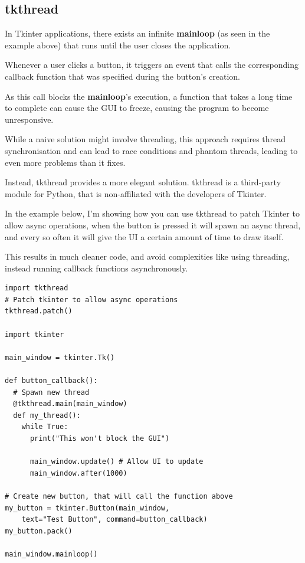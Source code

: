 \subsection{tkthread}
In Tkinter applications, there exists an infinite \textbf{mainloop}
(as seen in the example above)
that runs until the user closes the application.

Whenever a user clicks a button,
it triggers an event that calls the corresponding callback function
that was specified during the button's creation.

As this call blocks the \textbf{mainloop}'s execution,
a function that takes a long time to complete can cause the GUI to freeze,
causing the program to become unresponsive.

While a naive solution might involve threading,
this approach requires thread synchronisation and can lead to race conditions
and phantom threads, leading to even more problems than it fixes.

Instead, tkthread \cite{tkthread} provides a more elegant solution.
tkthread is a third-party module for Python,
that is non-affiliated with the developers of Tkinter.

In the example below, I'm showing how you can use tkthread to patch
Tkinter to allow async operations,
when the button is pressed it will spawn an async thread,
and every so often it will give the
UI a certain amount of time to draw itself.

This results in much cleaner code,
and avoid complexities like using threading,
instead running callback functions asynchronously.

\begin{lstlisting}
import tkthread
# Patch tkinter to allow async operations
tkthread.patch()

import tkinter

main_window = tkinter.Tk()

def button_callback():
  # Spawn new thread
  @tkthread.main(main_window)
  def my_thread():
    while True:
      print("This won't block the GUI")
      
      main_window.update() # Allow UI to update
      main_window.after(1000)

# Create new button, that will call the function above
my_button = tkinter.Button(main_window,
    text="Test Button", command=button_callback)
my_button.pack()

main_window.mainloop()
\end{lstlisting}

